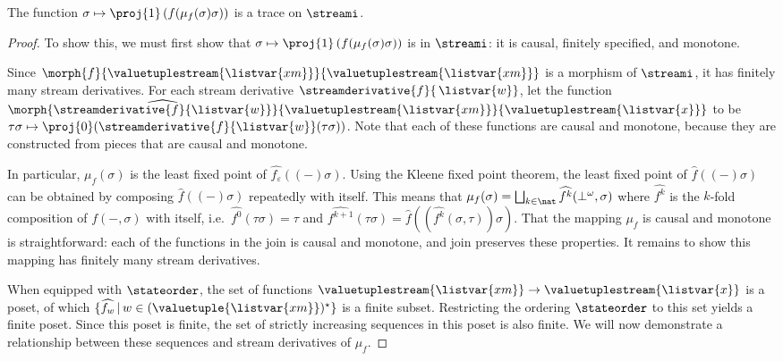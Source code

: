 \begin{proposition}
    The function \(\sigma \mapsto \proj{1}\left(f(\mu_f(\sigma)\sigma)\right)\)
    is a trace on \(\streami\).
\end{proposition}
\begin{proof}
    To show this, we must first show that
    \(\sigma \mapsto \proj{1}\left(f(\mu_f(\sigma)\sigma)\right)\) is in
    \(\streami\): it is causal, finitely specified, and monotone.

    Since \(
        \morph{f}{\valuetuplestream{\listvar{xm}}}{\valuetuplestream{\listvar{xm}}}
    \) is a morphism of \(\streami\), it has finitely many stream derivatives.
    For each stream derivative \(\streamderivative{f}{\,\listvar{w}}\), let the
    function \(
        \morph{
            \widehat{\streamderivative{f}{\listvar{w}}}
        }{
            \valuetuplestream{\listvar{xm}}
        }{
            \valuetuplestream{\listvar{x}}
        }
    \) to be \(
        \tau\sigma
        \mapsto
        \proj{0}(\streamderivative{f}{\listvar{w}}(\tau\sigma))
    \).
    Note that each of these functions are causal and monotone, because they are
    constructed from pieces that are causal and monotone.

    In particular, \(\mu_f(\sigma)\) is the least fixed point of
    \(\widehat{f_\varepsilon}\left((-)\sigma\right)\).
    Using the Kleene fixed point theorem, the least fixed point of
    \(\widehat{f}((-)\sigma)\) can be obtained by composing
    \(\widehat{f}((-)\sigma)\) repeatedly with itself.
    This means that \(
        \mu_f(\sigma)
        =
        \bigsqcup_{k \in \nat} \widehat{f^k}(\bot^\omega,\sigma)
    \) where \(\widehat{f^k}\) is the \(k\)-fold composition of \(f(-,\sigma)\)
    with itself, i.e.\ \(\widehat{f^0}(\tau\sigma) = \tau\) and \(
        \widehat{f^{k+1}}(\tau\sigma)
        =
        \widehat{f}\left(\left(\widehat{f^{k}}(\sigma, \tau)\right)\sigma\right)
    \).
    That the mapping \(\mu_f\) is causal and monotone is
    straightforward: each of the functions in the join is causal and monotone,
    and join preserves these properties.
    It remains to show this mapping has finitely many stream derivatives.

    When equipped with \(\stateorder\), the set of functions
    \(\valuetuplestream{\listvar{xm}} \to \valuetuplestream{\listvar{x}}\)
    is a poset, of which
    \(\{\widehat{f_w} \,|\, w \in (\valuetuple{\listvar{xm}})^\star\}\)
    is a finite subset.
    Restricting the ordering \(\stateorder\) to this set yields a finite poset.
    Since this poset is finite, the set of strictly increasing sequences in this
    poset is also finite.
    We will now demonstrate a relationship between these sequences and stream
    derivatives of \(\mu_f\).


\end{proof}
